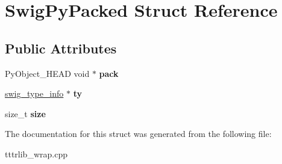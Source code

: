 \hypertarget{struct_swig_py_packed}{}\section{Swig\+Py\+Packed Struct Reference}
\label{struct_swig_py_packed}
\subsection*{Public Attributes}
\begin{DoxyCompactItemize}
\item 
\mbox{\label{struct_swig_py_packed_af5122bcb9e73bf2dec4ce5f58f004e1b}} 
Py\+Object\+\_\+\+H\+E\+AD void $\ast$ {\bfseries pack}
\item 
\mbox{\label{struct_swig_py_packed_aa6f6be0a8a1bff7710200fbe8d51acf0}} 
\hyperlink{structswig__type__info}{swig\+\_\+type\+\_\+info} $\ast$ {\bfseries ty}
\item 
\mbox{\label{struct_swig_py_packed_aed2bfb8fb3c9f804c386215db63921cb}} 
size\+\_\+t {\bfseries size}
\end{DoxyCompactItemize}


The documentation for this struct was generated from the following file\+:\begin{DoxyCompactItemize}
\item 
tttrlib\+\_\+wrap.\+cpp\end{DoxyCompactItemize}
